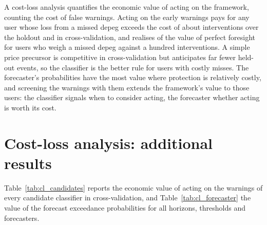 A cost-loss analysis quantifies the economic value of acting on the framework, counting the cost of false
warnings. Acting on the early warnings pays for any user whose loss from a missed depeg exceeds the cost of
about \clHoPays{} interventions over the holdout and \clCvPays{} in cross-validation, and realises
\clHoVa{} of the value of perfect foresight for users who weigh a missed depeg against a hundred
interventions. A simple price precursor is competitive in cross-validation but anticipates far fewer
held-out events, so the classifier is the better rule for users with costly misses. The forecaster's
probabilities have the most value where protection is relatively costly, and screening the warnings with
them extends the framework's value to those users: the classifier signals when to consider acting, the
forecaster whether acting is worth its cost.


\section{Cost-loss analysis: additional results}\label{sec:cl_appendix}

Table~\ref{tab:cl_candidates} reports the economic value of acting on the warnings of every candidate
classifier in cross-validation, and Table~\ref{tab:cl_forecaster} the value of the forecast exceedance
probabilities for all horizons, thresholds and forecasters.




